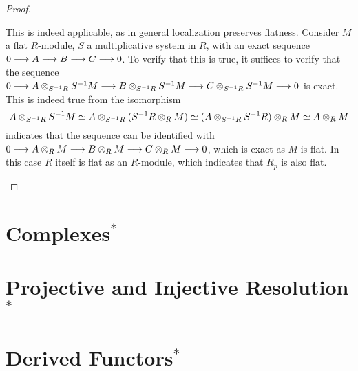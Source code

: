 \documentclass{article}
\begin{document}
\begin{proof}
\begin{enumerate}
        This is indeed applicable, as in general localization preserves flatness. Consider $M$ a flat $R$-module, $S$ a multiplicative system in $R$, with an exact sequence $0 \longrightarrow A \longrightarrow B \longrightarrow C \longrightarrow 0$. To verify that this is true, it suffices to verify that the sequence $0 \longrightarrow A \otimes_{S^{-1}R} S^{-1}M \longrightarrow B \otimes_{S^{-1}R} S^{-1}M \longrightarrow C \otimes_{S^{-1}R} S^{-1}M \longrightarrow 0$ is exact. This is indeed true from the isomorphism 
        \[
            A \otimes_{S^{-1}R} S^{-1}M \simeq A \otimes_{S^{-1}R} (S^{-1}R \otimes_R M) \simeq (A \otimes_{S^{-1}R} S^{-1}R) \otimes_R M \simeq A \otimes_R M
        \]
        indicates that the sequence can be identified with $0 \longrightarrow A \otimes_R M \longrightarrow B \otimes_R M \longrightarrow C \otimes_R M \longrightarrow 0$, which is exact as $M$ is flat. In this case $R$ itself is flat as an $R$-module, which indicates that $R_p$ is also flat.
    \end{enumerate}

\end{proof}

\section{Complexes$^*$}



\section{Projective and Injective Resolution$^*$}

\section{Derived Functors$^*$}
\end{document}
